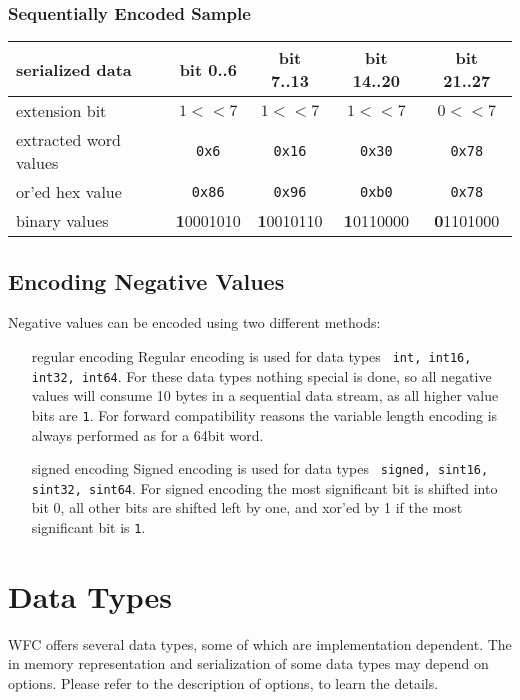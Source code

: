 \documentclass[12pt]{article}
\begin{document}
\subsubsection*{Sequentially Encoded Sample}
\begin{tabular}{|l|c|c|c|c|}
\hline
	serialized data & {bit 0..6} & {bit 7..13} & {bit 14..20} &  {bit 21..27} \\
\hline
	extension bit & $1<<7$ & $1<<7$ & $1<<7$ & $0<<7$ \\
\hline
	extracted word values & {\tt 0x6} & {\tt 0x16} &  {\tt 0x30} &  {\tt 0x78} \\
\hline
	or'ed hex value & {\tt 0x86} & {\tt 0x96} & {\tt 0xb0} & {\tt 0x78} \\
\hline
	binary values &{\bf 1}0001010 & {\bf 1}0010110 & {\bf 1}0110000 & {\bf 0}1101000\\
\hline
\end{tabular}


\subsection{Encoding Negative Values}
Negative values can be encoded using two different methods:
\begin{itemize}
	\item[regular encoding] Regular encoding is used for data types {\tt
		int, int16, int32, int64}. For these data types nothing special
		is done, so all negative values will consume 10 bytes in a
		sequential data stream, as all higher value bits are {\tt 1}.
		For forward compatibility reasons the variable length encoding
		is always performed as for a 64bit word.
	\item[signed encoding] Signed encoding is used for data types {\tt
		signed, sint16, sint32, sint64}. For signed encoding the most
		significant bit is shifted into bit 0, all other bits are
		shifted left by one, and xor'ed by 1 if the most significant
		bit is {\tt 1}.
\end{itemize}



\section{Data Types}
WFC offers several data types, some of which are implementation dependent. The
in memory representation and serialization of some data types may depend on
options. Please refer to the description of options, to learn the details.
\end{document}
